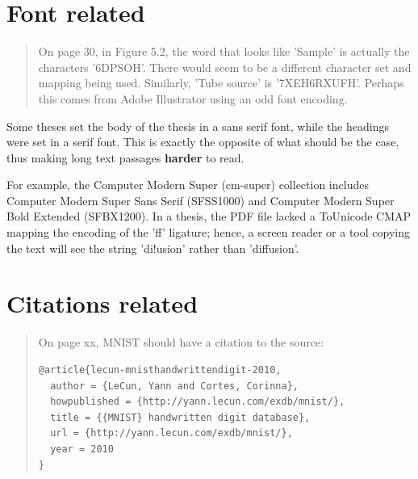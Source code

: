 \documentclass[
English,                 %
biblatex,             %
]{kththesis}
\begin{document}
\section*{Font related}
\begin{quote}
   On page 30, in Figure 5.2, the word that looks like 'Sample' is actually the characters '6DPSOH'. There would seem to be a different character set and mapping being used. Similarly, 'Tube source' is '7XEH6RXUFH'. Perhaps this comes from Adobe Illustrator using an odd font encoding. 
\end{quote}

Some theses set the body of the thesis in a sans serif font, while the headings were set in a serif font. This is exactly the opposite of what should be the case, thus making long text passages \textbf{harder} to read.

For example, the Computer Modern Super (cm-super) collection includes Computer Modern Super Sans Serif (SFSS1000) and Computer Modern Super Bold Extended (SFBX1200). In a thesis, the PDF file lacked a ToUnicode
CMAP mapping the encoding of the 'ﬀ' ligature; hence, a screen reader or a tool copying the text will see the string 'di!usion' rather than 
'diﬀusion'.



\section*{Citations related}

\begin{quote}
On page xx, MNIST should have a citation to the source\cite{lecun-mnisthandwrittendigit-2010}:
\begin{footnotesize}
\begin{verbatim}
@article{lecun-mnisthandwrittendigit-2010,
  author = {LeCun, Yann and Cortes, Corinna},
  howpublished = {http://yann.lecun.com/exdb/mnist/},
  title = {{MNIST} handwritten digit database},
  url = {http://yann.lecun.com/exdb/mnist/},
  year = 2010
}
\end{verbatim}
\end{footnotesize}
\end{quote}
\end{document}
